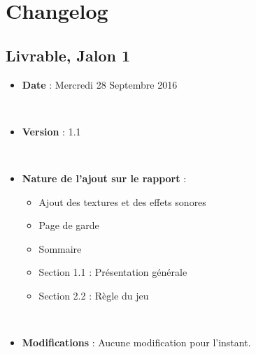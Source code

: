 \documentclass[12pt,a4paper]{report}
\begin{document}
    \chapter{Changelog}
    \section{Livrable, Jalon 1}
    \begin{itemize}
\item \textbf{Date}  : Mercredi 28 Septembre 2016

\par\leavevmode\
\item \textbf{Version}  : 1.1

\par\leavevmode\
\item \textbf{Nature de l'ajout sur le rapport}  : \begin{itemize}\item Ajout des textures et des effets sonores \item Page de garde \item Sommaire \item Section 1.1 : Présentation générale \item Section 2.2 : Règle du jeu \end{itemize}

\par\leavevmode\
\item \textbf{Modifications}  : Aucune modification pour l'instant.\end{itemize}
    
    
\end{document}
